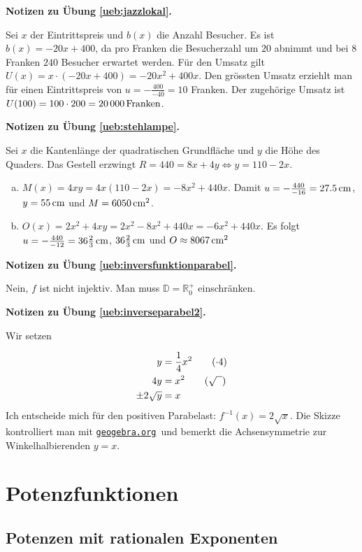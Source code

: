 \documentclass[%
11pt,%
twoside,%
titlepage,%
swissgerman,%
headsepline%
]{scrartcl}
\newcommand{\faReturnGray}{\textcolor{gray}{\faMailReply}} %
\newcommand{\geogebralink}{\href{https://www.geogebra.org/calculator}{\texttt{geogebra.org}}}
\theoremstyle{definition}
\theoremstyle{plain}
\newcommand{\concatueb}[1]{ueb:#1}%
\newcommand{\concatlsg}[1]{lsg:#1}%
\newenvironment{lsg}[1]{%
    \par\noindent\textbf{Notizen zu Übung \ref{\concatueb{#1}}.}%
    \label{\concatlsg{#1}} %
    \hfill\hyperref[\concatueb{#1}]{\faReturnGray}\par %
}{%
    \par%
}
\begin{document}
\begin{lsg}{jazzlokal}
    Sei $x$ der Eintrittspreis und $b(x)$ die Anzahl Besucher. Es ist $b(x)=-20x+400$, da pro Franken die Besucherzahl um $20$ abnimmt und bei $8$ Franken $240$ Besucher erwartet werden. Für den Umsatz gilt $U(x)=x\cdot(-20x+400)=-20x^2+400x$. Den grössten Umsatz erziehlt man für einen Eintrittspreis von $u=-\frac{400}{-40}=10$ Franken. Der zugehörige Umsatz ist $U(100)=100\cdot200=\unit[20\,000]{Franken}$.
\end{lsg}
\begin{lsg}{stehlampe}
    Sei $x$ die Kantenlänge der quadratischen Grundfläche und $y$ die Höhe des Quaders. Das Gestell erzwingt $R=440=8x+4y\Leftrightarrow y=110-2x$.
    \begin{enumerate}[a)]
        \item $M(x)=4xy=4x(110-2x)=-8x^2+440x$. Damit $u=-\frac{440}{-16}=\unit[27.5]{cm}$, $y=\unit[55]{cm}$ und $M=\unit[6050]{cm^2}$.
        \item $O(x)=2x^2+4xy=2x^2-8x^2+440x=-6x^2+440x$. Es folgt $u=-\frac{440}{-12}=\unit[36\frac{2}{3}]{cm}$, $\unit[36\frac{2}{3}]{cm}$ und $O\approx\unit[8067]{cm^2}$
    \end{enumerate}
\end{lsg}
\begin{lsg}{inversfunktionparabel}
    Nein, $f$ ist nicht injektiv. Man muss $\mathbb{D}=\mathbb{R}^+_0$ einschränken.
\end{lsg}
\begin{lsg}{inverseparabel2}
    Wir setzen

    \begin{align*}
        y &= \frac{1}{4}x^2\tag{$\cdot 4$}\\
        4y &= x^2\tag{$\sqrt{\phantom{x}}$}\\
        \pm2\sqrt{y} &= x
    \end{align*}
    Ich entscheide mich für den positiven Parabelast: $f^{-1}(x)=2\sqrt{x}$. Die Skizze kontrolliert man mit \geogebralink\ und bemerkt die Achsensymmetrie zur Winkelhalbierenden $y=x$.
\end{lsg}

\clearpage
 
\section{Potenzfunktionen}
  
\subsection{Potenzen mit rationalen Exponenten}
\end{document}
